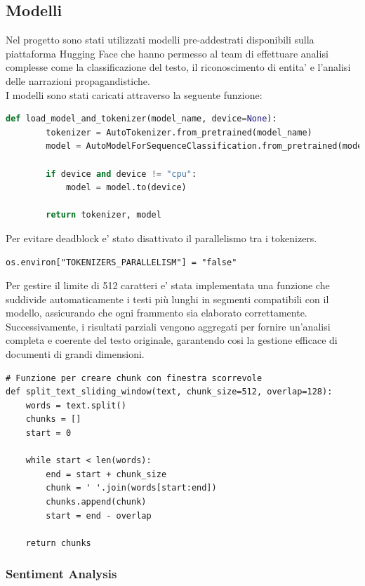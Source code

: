 \documentclass{article}
\begin{document}
	\subsection{Modelli}
	
	Nel progetto sono stati utilizzati modelli pre-addestrati disponibili sulla piattaforma Hugging Face che hanno permesso al team di effettuare analisi complesse come la classificazione del testo, il riconoscimento di entita' e l'analisi delle narrazioni propagandistiche.\\
	I modelli sono stati caricati attraverso la seguente funzione:
	\begin{lstlisting}[language=python]
	def load_model_and_tokenizer(model_name, device=None):
		tokenizer = AutoTokenizer.from_pretrained(model_name)
		model = AutoModelForSequenceClassification.from_pretrained(model_name)
		
		if device and device != "cpu":
			model = model.to(device)
		
		return tokenizer, model
	\end{lstlisting}
	Per evitare deadblock e' stato disattivato il parallelismo tra i tokenizers.
	\begin{lstlisting}
os.environ["TOKENIZERS_PARALLELISM"] = "false"
	\end{lstlisting}

	Per gestire il limite di 512 caratteri e' stata implementata una  funzione che suddivide automaticamente i testi più lunghi in segmenti compatibili con il modello, assicurando che ogni frammento sia elaborato correttamente.\\
	Successivamente, i risultati parziali vengono aggregati per fornire un'analisi completa e coerente del testo originale, garantendo cosi la gestione efficace di documenti di grandi dimensioni.
	\begin{lstlisting}
# Funzione per creare chunk con finestra scorrevole
def split_text_sliding_window(text, chunk_size=512, overlap=128):
	words = text.split()
	chunks = []
	start = 0
	
	while start < len(words):
		end = start + chunk_size
		chunk = ' '.join(words[start:end])
		chunks.append(chunk)
		start = end - overlap

	return chunks
	\end{lstlisting}


\newpage

		\subsubsection{Sentiment Analysis}
	
\end{document}
